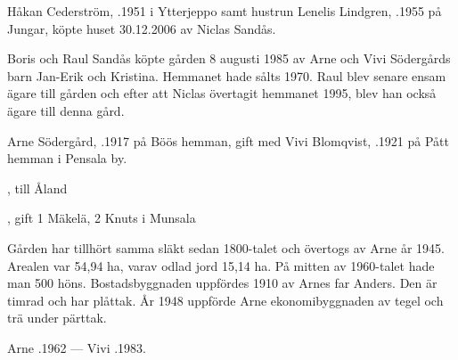 


Håkan Cederström, .1951 i Ytterjeppo samt hustrun Lenelis Lindgren, .1955 på Jungar, köpte huset 30.12.2006 av Niclas Sandås.\jhvspace{}

Boris och Raul Sandås köpte gården 8 augusti 1985 av Arne och Vivi Södergårds barn Jan-Erik och Kristina. Hemmanet hade sålts 1970. Raul blev senare ensam ägare till gården och efter att Niclas övertagit hemmanet 1995, blev han också ägare till denna gård.\jhvspace{}


Arne Södergård, .1917 på Böös hemman, gift med Vivi Blomqvist, .1921 på Pått hemman i Pensala by.
\begin{jhchildren}
  \item {}, till Åland
  \item {}, gift 1 Mäkelä, 2 Knuts i Munsala
  \item {}
\end{jhchildren}

Gården har tillhört samma släkt sedan 1800-talet och övertogs av Arne år 1945. Arealen var 54,94 ha, varav odlad jord 15,14 ha. På mitten av 1960-talet hade man 500 höns. Bostadsbyggnaden  uppfördes 1910 av Arnes far Anders. Den är timrad och har plåttak. År 1948 uppförde Arne ekonomibyggnaden av tegel och trä under pärttak.

Arne .1962  ---  Vivi .1983.



